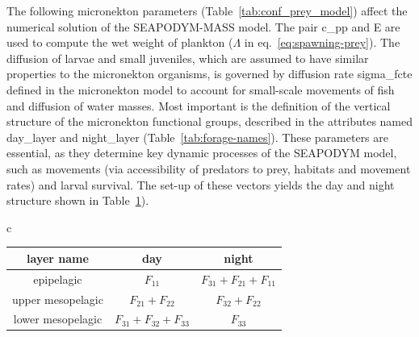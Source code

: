 The following micronekton parameters (Table~\ref{tab:conf_prey_model}) affect the numerical solution of the SEAPODYM-MASS model. The pair {\ttfamily c\_pp} and {\ttfamily E} are used to compute the wet weight of plankton ($\Lambda$ in eq.~\ref{eq:spawning-prey}). The diffusion of larvae and small juveniles, which are assumed to have similar properties to the micronekton organisms, is governed by diffusion rate {\ttfamily sigma\_fcte} defined in the  micronekton model to account for small-scale movements of fish and diffusion of water masses. Most important is the definition of the vertical structure of the micronekton functional groups, described in the attributes named {\ttfamily day\_layer} and {\ttfamily night\_layer} (Table~\ref{tab:forage-names}). These parameters are essential, as they determine key dynamic processes of the SEAPODYM model, such as movements (via accessibility of predators to prey, habitats and movement rates) and larval survival. The set-up of these vectors yields the day and night structure shown in Table~\ref{tab:forage-in-layers}).  \\

\begin{table}[H]
\begin{center}
\begin{tabular}{c}
  \begin{tabular}{|c||c||c|}

    \hline
    \textbf{layer name}& \textbf{day} & \textbf{night} \\
    \hline
    \hline
    epipelagic   & $F_{11}$  & $F_{31}+F_{21}+F_{11}$ \\
    \hline
    upper mesopelagic & $F_{21}+F_{22}$ &  $F_{32}+F_{22}$  \\
    \hline
    lower mesopelagic & $F_{31}+F_{32}+F_{33}$  & $F_{33}$\\
    \hline
  \end{tabular}\\
\end{tabular}
\label{tab:forage-in-layers}
\end{center}
\end{table}

